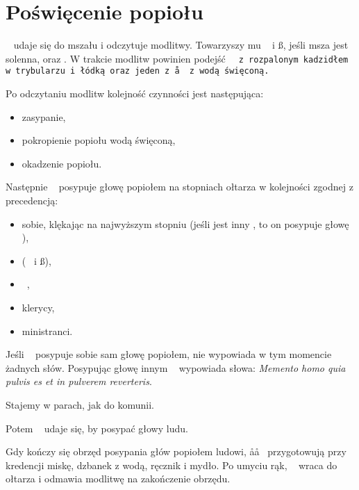 \section{Poświęcenie popiołu}
\begin{itemize*}
	\item \ii~ udaje się do mszału i odczytuje modlitwy. Towarzyszy mu \dd~ i
	      \ss, jeśli msza jest solenna, oraz . W trakcie modlitw powinien
	      podejść \tt~ z rozpalonym kadzidłem w trybularzu i łódką oraz jeden
	      z \aa~ z wodą święconą.
	\item Po odczytaniu modlitw kolejność czynności jest następująca:
	      \begin{itemize}
		      \item zasypanie,
		      \item pokropienie popiołu wodą święconą,
		      \item okadzenie popiołu.
	      \end{itemize}
	\item Następnie \ii~ posypuje głowę popiołem na stopniach ołtarza w
	      kolejności zgodnej z precedencją:
	      \begin{itemize}
		      \item sobie, klękając na najwyższym stopniu (jeśli jest inny \ii,
		            to on posypuje głowę \ii),
		      \item (\dd~ i \ss),
		      \item \ii~,
		      \item klerycy,
		      \item ministranci.
	      \end{itemize}
	\item Jeśli \ii~ posypuje sobie sam głowę popiołem, nie wypowiada w tym
	      momencie żadnych słów. Posypując głowę innym \ii~ wypowiada słowa:
	      \textit{Memento homo quia pulvis es et in pulverem reverteris}.
	\item Stajemy w parach, jak do komunii.
	\item Potem \ii~ udaje się, by posypać głowy ludu.
	\item Gdy kończy się obrzęd posypania głów popiołem ludowi, \aa\aa~
	      przygotowują przy kredencji miskę, dzbanek z wodą, ręcznik i mydło. Po
	      umyciu rąk, \ii~ wraca do ołtarza i odmawia modlitwę na zakończenie
	      obrzędu.
\end{itemize*}
